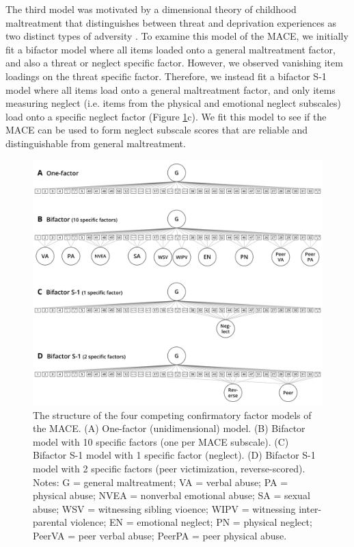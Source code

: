 \documentclass[letterpaper,man,natbib,noextraspace,floatsintext,longtable,12pt]{apa6}
\begin{document}
The third model was motivated by a dimensional theory of childhood maltreatment that distinguishes between threat and deprivation experiences as two distinct types of adversity \citep{mclaughlin2014childhood}. To examine this model of the MACE, we initially fit a bifactor model where all items loaded onto a general maltreatment factor, and also a threat or neglect specific factor. However, we observed vanishing item loadings on the threat specific factor. Therefore, we instead fit a bifactor S-1 model \citep{eid2017anomalous} where all items load onto a general maltreatment factor, and only items measuring neglect (i.e. items from the physical and emotional neglect subscales) load onto a specific neglect factor (Figure \ref{fig:models}c). We fit this model to see if the MACE can be used to form neglect subscale scores that are reliable and distinguishable from general maltreatment. 

\begin{figure}[t!]
    \centering
    \includegraphics[width=1.1\textwidth,center]{figures/fig01.png}
    \captionsetup{width=1.1\textwidth}
    \caption{\normalfont The structure of the four competing confirmatory factor models of the MACE. (A) One-factor (unidimensional) model. (B) Bifactor model with 10 specific factors (one per MACE subscale). (C) Bifactor S-1 model with 1 specific factor (neglect). (D) Bifactor S-1 model with 2 specific factors (peer victimization, reverse-scored). Notes: G = general maltreatment; VA = verbal abuse; PA = physical abuse; NVEA = nonverbal emotional abuse; SA = sexual abuse; WSV = witnessing sibling vioence; WIPV = witnessing inter-parental violence; EN = emotional neglect; PN = physical neglect; PeerVA = peer verbal abuse; PeerPA = peer physical abuse.}
    \label{fig:models}
\end{figure}
\end{document}
